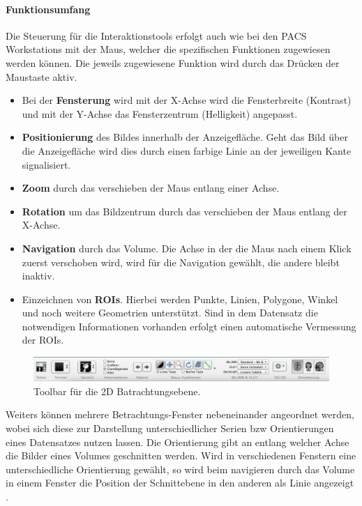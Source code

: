 \paragraph{Funktionsumfang}
Die Steuerung für die Interaktionstools erfolgt auch wie bei den PACS Workstations mit der Maus, 
welcher die spezifischen Funktionen zugewiesen werden können. Die jeweils zugewiesene Funktion wird durch das Drücken der Maustaste aktiv.
\begin{itemize}
	\item Bei der \textbf{Fensterung} wird mit der X-Achse wird die Fensterbreite (Kontrast) und mit der Y-Achse das Fensterzentrum (Helligkeit) angepasst.
	\item \textbf{Positionierung} des Bildes innerhalb der Anzeigefläche. Geht das Bild über die Anzeigefläche wird dies durch einen farbige Linie an der jeweiligen Kante signalisiert.
	\item \textbf{Zoom} durch das verschieben der Maus entlang einer Achse.
	\item \textbf{Rotation} um das Bildzentrum durch das verschieben der Maus entlang der X-Achse.
	\item \textbf{Navigation} durch das Volume. Die Achse in der die Maus nach einem Klick zuerst verschoben wird, wird für die Navigation gewählt, die andere bleibt inaktiv.
	\item Einzeichnen von \textbf{ROIs}. Hierbei werden Punkte, Linien, Polygone, Winkel und noch weitere Geometrien unterstützt. 
		Sind in dem Datensatz die notwendigen Informationen vorhanden erfolgt einen automatische Vermessung der ROIs.
\end{itemize}
\begin{figure}[t]
	\centering
	\includegraphics[width=0.8\linewidth]{img/c2_osirix_2d_view_toolbar.jpg}
	\caption{Toolbar für die 2D Batrachtungsebene.}
\end{figure}
Weiters können mehrere Betrachtungs-Fenster nebeneinander angeordnet werden, wobei sich diese zur Darstellung unterschiedlicher Serien bzw Orientierungen eines Datensatzes nutzen lassen. 
Die Orientierung gibt an entlang welcher Achse die Bilder eines Volumes geschnitten werden.
Wird in verschiedenen Fenstern eine unterschiedliche Orientierung gewählt,
so wird beim navigieren durch das Volume in einem Fenster die Position der Schnittebene in den anderen als Linie angezeigt \cite{osirix}.
